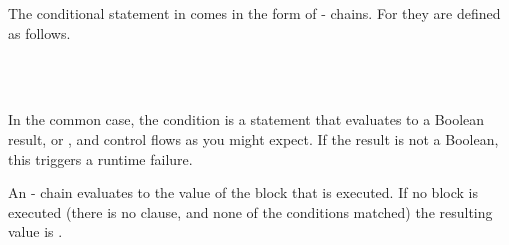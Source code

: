 The conditional statement in \Trilogy{} comes in the form of -
chains. For \Prose{} they are defined as follows.

\begin{bnf*}
     \\
     \\
\end{bnf*}

In the common case, the condition is a statement that evaluates to a Boolean
result,  or , and control flows as you might expect.
If the result is not a Boolean, this triggers a runtime failure.

An - chain evaluates to the value of the block that is executed.
If no block is executed (there is no  clause, and none of the
conditions matched) the resulting value is .

\begin{prooftree}
\end{prooftree}
\begin{prooftree}
\end{prooftree}
\begin{prooftree}
\end{prooftree}
\begin{prooftree}
\end{prooftree}

